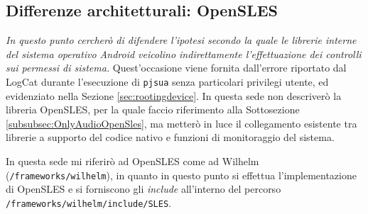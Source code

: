
\subsection{Differenze architetturali: OpenSLES}\label{subsec:mischeWilhelm}
\textit{In questo punto cercherò di difendere l'ipotesi secondo la quale le librerie
interne del sistema operativo Android veicolino indirettamente l'effettuazione
dei controlli sui permessi di sistema.} Quest'occasione viene fornita 
dall'errore riportato dal LogCat durante l'esecuzione di \texttt{pjsua} senza particolari
privilegi utente, ed evidenziato nella Sezione \vref{sec:rootingdevice}. 
In questa sede non descriverò
la libreria OpenSLES, per la quale faccio riferimento alla Sottosezione 
\vref{subsubsec:OnlyAudioOpenSles},
ma metterò in luce il collegamento esistente tra librerie  a supporto
del codice nativo e funzioni di monitoraggio del sistema.

In questa sede mi riferirò ad OpenSLES come ad Wilhelm (\texttt{\small \AOSP/frameworks/wilhelm}),
in quanto in questo punto si effettua l'implementazione di OpenSLES e si forniscono
gli \textit{include} all'interno del percorso \texttt{\small \AOSP/frameworks/wilhelm/include/SLES}.
\medskip




